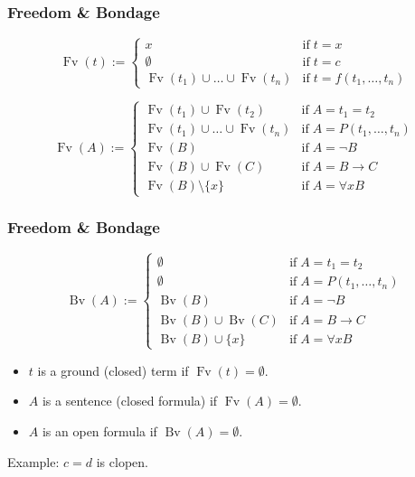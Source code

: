 \documentclass[UTF8,aspectratio=43,11pt,colorlinks,compress,openany]{beamer}%
\begin{document}
\begin{frame}\frametitle{Freedom \& Bondage}
	\begin{definition}
		\[
		\operatorname{Fv}(t):=
		\begin{cases}
		x &\text{if}\;t=x\\
		\emptyset &\text{if}\;t=c\\
		\operatorname{Fv}(t_1)\cup\dots\cup \operatorname{Fv}(t_n) &\text{if}\;t=f(t_1,\dots,t_n)
		\end{cases}
		\]
	\end{definition}
	\begin{definition}
		\[
		\operatorname{Fv}(A):=
		\begin{cases}
		\operatorname{Fv}(t_1)\cup \operatorname{Fv}(t_2) &\text{if}\; A=t_1=t_2\\
		\operatorname{Fv}(t_1)\cup\dots\cup \operatorname{Fv}(t_n) &\text{if}\; A=P(t_1,\dots,t_n)\\
		\operatorname{Fv}(B) &\text{if}\; A=\neg B\\
		\operatorname{Fv}(B)\cup \operatorname{Fv}(C) &\text{if}\; A=B\to C\\
		\operatorname{Fv}(B)\setminus\{x\} &\text{if}\; A=\forall x B
		\end{cases}
		\]
	\end{definition}
\end{frame}

\begin{frame}\frametitle{Freedom \& Bondage}
	\begin{definition}
		\[\operatorname{Bv}(A):=
		\begin{cases}
		\emptyset &\text{if}\; A=t_1=t_2\\
		\emptyset &\text{if}\; A=P(t_1,\dots,t_n)\\
		\operatorname{Bv}(B) &\text{if}\; A=\neg B\\
		\operatorname{Bv}(B)\cup \operatorname{Bv}(C) &\text{if}\; A=B\to C\\
		\operatorname{Bv}(B)\cup\{x\} &\text{if}\; A=\forall x B
		\end{cases}\]
	\end{definition}
\begin{itemize}
	\item $t$ is a ground (closed) term if $\operatorname{Fv}(t)=\emptyset$.
	\item $A$ is a sentence (closed formula) if $\operatorname{Fv}(A)=\emptyset$.
	\item $A$ is an open formula if $\operatorname{Bv}(A)=\emptyset$.
\end{itemize}
	Example: $c=d$ is clopen.
\end{frame}
\end{document}
